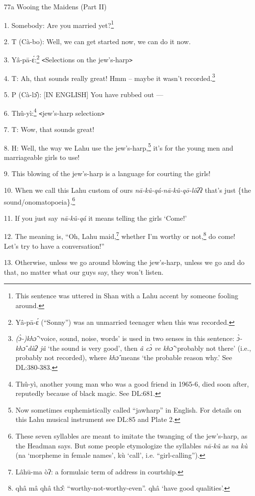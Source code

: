 
77a Wooing the Maidens (Part II)

1. Somebody: Are you married yet?\footnote{This sentence was uttered in Shan with a Lahu accent by someone fooling around.}

2. T (Cà-bo): Well, we can get started now, we can do it now.

3. Yâ-pā-ɛ́:\footnote{Yâ-pā-ɛ́ (``Sonny'') was an unmarried teenager when this was recorded.} \texttt{<}Selections on the jew's-harp\texttt{>}

4. T: Ah, that sounds really great! Hmm -- maybe it wasn't recorded.\footnote{\textit{(ɔ̀-)khɔ̂} `voice, sound, noise, words' is used in two senses in this sentence: \textit{ɔ̀-khɔ̂ dàʔ jâ} `the sound is very good’, then \textit{â cɔ̀ ve khɔ̂} `probably not there’ (i.e., probably not recorded), where \textit{khɔ̂} means `the probable reason why.’ See DL:380-383.}

5. P (Cà-lɔ̂): [IN ENGLISH] You have rubbed out ---

6. Thû-yì:\footnote{Thû-yì, another young man who was a good friend in 1965-6, died soon after, reputedly because of black magic. See DL:681.} \texttt{<}jew's-harp selection\texttt{>}

7. T: Wow, that sounds great!

8. H: Well, the way we Lahu use the jew's-harp,\footnote{Now sometimes euphemistically called ``jawharp'' in English. For details on this Lahu musical instrument see DL:85 and Plate 2.} it's for the young men and marriageable girls to use!

9. This blowing of the jew's-harp is a language for courting the girls!

10. When we call this Lahu custom of ours \textit{nā-kû-qá-nā-kû-qō-lôʔ}ʔ
that's just \{the sound/onomatopoeia\}.\footnote{These seven syllables are meant to imitate the twanging of the jew's-harp, as the Headman says. But some people etymologize the syllables \textit{nā-kû} as \textit{na kù} (na ‘morpheme in female names’, kù ‘call’, i.e. “girl-calling”).}

11. If you just say \textit{nā-kû-qá} it means telling the girls `Come!'

12. The meaning is, ``Oh, Lahu maid,\footnote{Lâhū-ma òʔ: a formulaic term of address in courtship.} whether I'm worthy or not,\footnote{qhâ mâ qhâ thɔ̂: ``worthy-not-worthy-even''. qhâ `have good qualities'.} do come!
Let's try to have a conversation!''

13. Otherwise, unless we go around blowing the jew's-harp, unless we go and do that,
no matter what our guys say, they won't listen.

